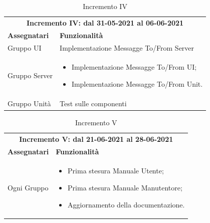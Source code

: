 \begin{table} [h!]
	\begin{center}
		\begin{tabular} { m{4cm}  m{11cm}  }	
			\multicolumn{2}{c}{	\textbf{Incremento IV: dal 31-05-2021 al 06-06-2021}} \\
			\rowcolor{lightgray}
			\textbf{Assegnatari} & \textbf{Funzionalità} \\
			Gruppo UI & Implementazione Messagge To/From Server\\	
			Gruppo Server & \begin{itemize}
				\item Implementazione Messagge To/From UI;
				\item Implementazione Messagge To/From Unit.
			\end{itemize}\\		
			Gruppo Unità & Test sulle componenti\\
			
		\end{tabular}
		\caption{Incremento IV}
	\end{center}
\end{table}

\begin{table} [h!]
	\begin{center}
		\begin{tabular} { m{4cm}  m{11cm}  }	
			\multicolumn{2}{c}{	\textbf{Incremento V: dal 21-06-2021 al 28-06-2021}} \\
			\rowcolor{lightgray}
			\textbf{Assegnatari} & \textbf{Funzionalità} \\
				Ogni Gruppo & \begin{itemize}
				\item Prima stesura Manuale Utente;
				\item Prima stesura Manuale Manutentore;
				\item Aggiornamento della documentazione.
			\end{itemize}\\		
			
		\end{tabular}
		\caption{Incremento V}
	\end{center}
\end{table}

